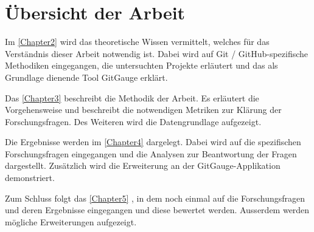 






\section{Übersicht der Arbeit}
Im \autoref{Chapter2} \textit{} wird das theoretische Wissen vermittelt, welches für das Verständnis dieser Arbeit notwendig ist. Dabei wird auf  Git / GitHub-spezifische Methodiken eingegangen, die untersuchten Projekte erläutert und das als Grundlage dienende Tool GitGauge erklärt.

Das \autoref{Chapter3} \textit{} beschreibt die Methodik der Arbeit. Es erläutert die Vorgehensweise und beschreibt die notwendigen Metriken zur Klärung der Forschungsfragen. Des Weiteren wird die Datengrundlage aufgezeigt.


Die Ergebnisse werden im \autoref{Chapter4} \textit{} dargelegt. Dabei wird auf die spezifischen Forschungsfragen eingegangen und die Analysen zur Beantwortung der Fragen dargestellt. Zusätzlich wird die Erweiterung an der GitGauge-Applikation demonstriert.

Zum Schluss folgt das \autoref{Chapter5} \textit{}, in dem noch einmal auf die Forschungsfragen und deren Ergebnisse eingegangen und diese bewertet werden. Ausserdem werden mögliche Erweiterungen aufgezeigt.





